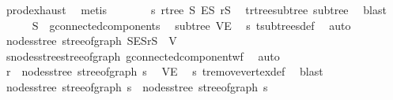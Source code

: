\begin{isabellebody}
\ prod{\isachardot}{\kern0pt}exhaust\ \isamarkupfalse%
\ metis\isanewline
\ \ \ \ \isamarkupfalse%
\ \isamarkupfalse%
\ s{\isacharcolon}{\kern0pt}\ rtree\ S\ E\isactrlsub S\ r\isactrlsub S\ \isamarkupfalse%
\ t{\isachardot}{\kern0pt}rtree{\isacharunderscore}{\kern0pt}subtree\ subtree\ \isamarkupfalse%
\ blast\isanewline
\ \ \ \ \isamarkupfalse%
\ {\isachardoublequoteopen}S\ {\isasymin}\ g{\isacharprime}{\kern0pt}{\isachardot}{\kern0pt}connected{\isacharunderscore}{\kern0pt}components{\isachardoublequoteclose}\ \isamarkupfalse%
\ subtree\ VE{\isacharprime}{\kern0pt}\ \isamarkupfalse%
\ s\ t{\isachardot}{\kern0pt}subtrees{\isacharunderscore}{\kern0pt}def\ \isamarkupfalse%
\ auto\isanewline
\ \ \ \ \isamarkupfalse%
\ \isamarkupfalse%
\ {\isachardoublequoteopen}nodes{\isacharunderscore}{\kern0pt}stree\ {\isacharparenleft}{\kern0pt}stree{\isacharunderscore}{\kern0pt}of{\isacharunderscore}{\kern0pt}graph\ {\isacharparenleft}{\kern0pt}S{\isacharcomma}{\kern0pt}E\isactrlsub S{\isacharcomma}{\kern0pt}r\isactrlsub S{\isacharparenright}{\kern0pt}{\isacharparenright}{\kern0pt}\ {\isasymsubseteq}\ V{\isacharprime}{\kern0pt}{\isachardoublequoteclose}\ \isamarkupfalse%
\ s{\isachardot}{\kern0pt}nodes{\isacharunderscore}{\kern0pt}stree{\isacharunderscore}{\kern0pt}stree{\isacharunderscore}{\kern0pt}of{\isacharunderscore}{\kern0pt}graph\ g{\isacharprime}{\kern0pt}{\isachardot}{\kern0pt}connected{\isacharunderscore}{\kern0pt}component{\isacharunderscore}{\kern0pt}wf\ \isamarkupfalse%
\ auto\isanewline
\ \ \ \ \isamarkupfalse%
\ \isamarkupfalse%
\ {\isachardoublequoteopen}r\ {\isasymnotin}\ nodes{\isacharunderscore}{\kern0pt}stree\ {\isacharparenleft}{\kern0pt}stree{\isacharunderscore}{\kern0pt}of{\isacharunderscore}{\kern0pt}graph\ s{\isacharparenright}{\kern0pt}{\isachardoublequoteclose}\ \isamarkupfalse%
\ VE{\isacharprime}{\kern0pt}\ \isamarkupfalse%
\ s\ t{\isachardot}{\kern0pt}remove{\isacharunderscore}{\kern0pt}vertex{\isacharunderscore}{\kern0pt}def\ \isamarkupfalse%
\ blast\isanewline
\ \ \isamarkupfalse%
\isanewline
\isanewline
\ \ \isamarkupfalse%
\ {\isachardoublequoteopen}nodes{\isacharunderscore}{\kern0pt}stree\ {\isacharparenleft}{\kern0pt}stree{\isacharunderscore}{\kern0pt}of{\isacharunderscore}{\kern0pt}graph\ s{}{\isacharparenright}{\kern0pt}\ {\isasyminter}\ nodes{\isacharunderscore}{\kern0pt}stree\ {\isacharparenleft}{\kern0pt}stree{\isacharunderscore}{\kern0pt}of{\isacharunderscore}{\kern0pt}graph\ s{}{\isacharparenright}{\kern0pt}\ {\isacharequal}{\kern0pt}\ {\isacharbraceleft}{\kern0pt}{\isacharbraceright}{\kern0pt}{\isachardoublequoteclose}\isanewline

\end{isabellebody}
